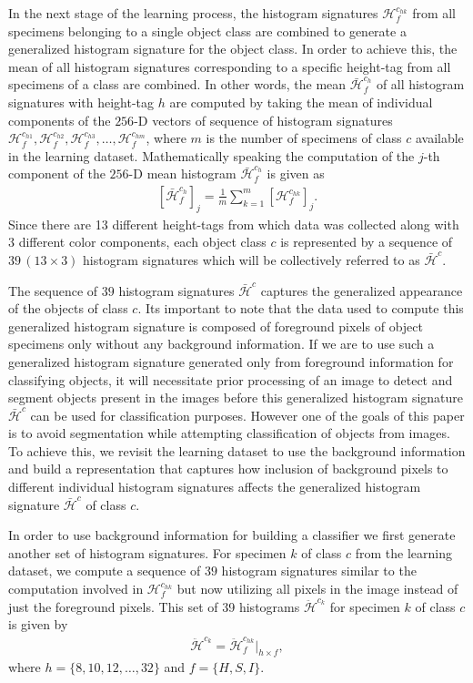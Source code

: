 \documentclass {udthesis}
\begin{document}
In the next stage of the learning process, the histogram signatures $\mathcal{H}^{c_{hk}}_f$ from all specimens belonging to a single object class are combined to generate a generalized histogram signature for the object class.
In order to achieve this, the mean of all histogram signatures corresponding to a specific height-tag from all specimens of a class are combined. In other words, the mean $\bar{\mathcal{H}}^{c_{h}}_f$ of all histogram signatures with  height-tag $h$ are computed by taking the mean of individual components of the $256$-D vectors of sequence of histogram signatures $\mathcal{H}^{c_{h1}}_f, \mathcal{H}^{c_{h2}}_f, \mathcal{H}^{c_{h3}}_f, \ldots, \mathcal{H}^{c_{hm}}_f$, where $m$ is the number of specimens of class $c$ available in the learning dataset. Mathematically speaking the computation of the $j$-th component of the $256$-D mean histogram $\bar{\mathcal{H}}^{c_{h}}_f$ is given as
\begin{align}
 \left[\bar{\mathcal{H}}^{c_{h}}_f\right]_j=\frac{1}{m}\sum_{k=1}^{m} \left[ \mathcal{H}^{c_{hk}}_f \right]_j.
\end{align}
Since there are 13 different height-tags from which data was collected along with 3 different color components, each object class $c$ is represented by a sequence of $39\, (13 \times 3)$ histogram signatures which will be collectively referred to as $\bar{\mathcal{H}}^{c}$.

The sequence of $39$ histogram signatures $\bar{\mathcal{H}}^{c}$ captures the generalized appearance of the objects of class $c$. Its important to note that the data used to compute this generalized histogram signature is composed of foreground pixels of object specimens only without any background information. If we are to use such a generalized histogram signature generated only from foreground information for classifying objects, it will necessitate prior processing of an image to detect and segment objects present in the images before this generalized histogram signature $\bar{\mathcal{H}}^{c}$ can be used for classification purposes. However one of the goals of this paper is to avoid segmentation while attempting classification of objects from images. To achieve this, we revisit the learning dataset to use the background information and build a representation that captures how inclusion of background pixels to different individual histogram signatures affects the generalized histogram signature $\bar{
\mathcal{H}}^{c}$ of class $c$. 

In order to use background information for building a classifier we first generate another set of histogram signatures.
For specimen $k$ of class $c$ from the learning dataset, we compute a sequence of $39$ histogram signatures similar to the computation involved in $\mathcal{H}^{c_{hk}}_f$ but now utilizing all pixels in the image instead of just the foreground pixels. This set of 39 histograms $\ddot{\mathcal{H}}^{c_{k}}$ for specimen $k$ of class $c$ is given by
\begin{align}	\label{eqn:hist_signature}
 \ddot{\mathcal{H}}^{c_{k}} = \ddot{\mathcal{H}}^{c_{hk}}_f \Big|_{h\times f},
\end{align}
%
where $h=\{8,10,12, \ldots,32\}$ and $f=\{H,S,I\}$.
\end{document}
